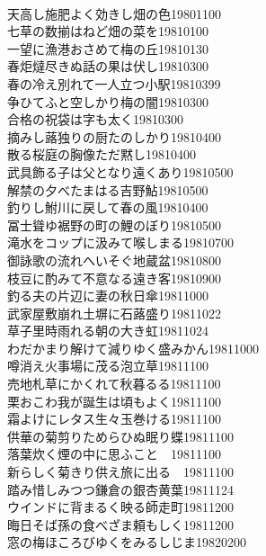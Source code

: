 \begin{multicols}{2}
\\天高し施肥よく効きし畑の色\hfill{19801100}
\\七草の数揃はねど畑の菜を\hfill{19810100}
\\一望に漁港おさめて梅の丘\hfill{19810130}
\\春炬燵尽きぬ話の果は伏し\hfill{19810300}
\\春の冷え別れて一人立つ小駅\hfill{19810399}
\\争ひてふと空しかり梅の闇\hfill{19810300}
\\合格の祝袋は字も太く\hfill{19810300}
\\摘みし蕗独りの厨たのしかり\hfill{19810400}
\\散る桜庭の胸像ただ黙し\hfill{19810400}
\\武具飾る子は父となり遠くあり\hfill{19810500}
\\解禁の夕べたまはる吉野鮎\hfill{19810500}
\\釣りし鮒川に戻して春の風\hfill{19810400}
\\冨士聳ゆ裾野の町の鯉のぼり\hfill{19810500}
\\滝水をコップに汲みて喉しまる\hfill{19810700}
\\御詠歌の流れへいそぐ地蔵盆\hfill{19810800}
\\枝豆に酌みて不意なる遠き客\hfill{19810900}
\\釣る夫の片辺に妻の秋日傘\hfill{19811000}
\\武家屋敷崩れ土塀に石蕗盛り\hfill{19811022}
\\草子里時雨れる朝の大き虹\hfill{19811024}
\\わだかまり解けて減りゆく盛みかん\hfill{19811000}
\\噂消え火事場に茂る泡立草\hfill{19811100}
\\売地札草にかくれて秋暮るる\hfill{19811100}
\\栗おこわ我が誕生は頃もよく\hfill{19811100}
\\霜よけにレタス生々玉巻ける\hfill{19811100}
\\供華の菊剪りためらひぬ眠り蝶\hfill{19811100}
\\落葉炊く煙の中に思ふこと　\hfill{19811100}
\\新らしく菊きり供え旅に出る　\hfill{19811100}
\\踏み惜しみつつ鎌倉の銀杏黄葉\hfill{19811124}
\\ウインドに背まるく映る師走町\hfill{19811200}
\\晦日そば孫の食べざま頼もしく\hfill{19811200}
\\窓の梅ほころびゆくをみるしじま\hfill{19820200}

\end{multicols}
